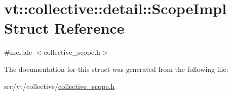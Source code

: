 \hypertarget{structvt_1_1collective_1_1detail_1_1_scope_impl}{}\section{vt\+:\+:collective\+:\+:detail\+:\+:Scope\+Impl Struct Reference}
\label{structvt_1_1collective_1_1detail_1_1_scope_impl}


{\ttfamily \#include $<$collective\+\_\+scope.\+h$>$}



The documentation for this struct was generated from the following file\+:\begin{DoxyCompactItemize}
\item 
src/vt/collective/\hyperlink{collective__scope_8h}{collective\+\_\+scope.\+h}\end{DoxyCompactItemize}
